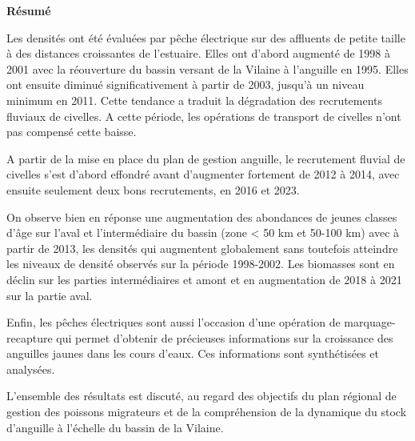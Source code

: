 \documentclass[10pt,twocolumn,titlepage,twoside]{article}\usepackage[]{graphicx}\usepackage[]{color}
\begin{document}
\onecolumn
\thispagestyle{empty}
\pagecolor{bleu_EV}
\begin{tcolorbox}[enhanced jigsaw,
                  colback=turquoise_EV!30,%
                  colframe=turquoise_EV,%
                  width=\textwidth,%
                  arc=3mm, auto outer arc,
                  boxrule=5pt,
                  drop shadow={bleu_EV!50!gray!80}
                 ]
\textbf{Résumé}\par

 \vspace{8mm}
 
 
    Les densités ont été évaluées par pêche électrique  sur des
    affluents de petite taille à des distances croissantes de l'estuaire.     
    Elles ont d'abord augmenté de 1998 à 2001 avec la réouverture du
    bassin versant de la Vilaine à l'anguille en 1995. Elles ont ensuite diminué
    significativement à partir de 2003, jusqu'à un niveau minimum en 2011. Cette tendance a traduit la dégradation des
    recrutements fluviaux de civelles. A cette période, les opérations de
    transport de civelles n'ont pas compensé cette baisse.  
    
    A partir de la mise en place du plan de gestion anguille,  le recrutement
    fluvial de civelles s'est d'abord effondré avant d'augmenter fortement de
    2012 à 2014, avec ensuite seulement deux bons recrutements, en 2016 et 2023.
    
    On observe bien en réponse une augmentation des abondances de jeunes
    classes d'âge sur l'aval et l'intermédiaire du bassin (zone < 50 km et
    50-100 km) avec à partir de 2013, les densités qui augmentent globalement
    sans toutefois atteindre les niveaux de densité
    observés sur la période 1998-2002. Les biomasses sont en déclin sur les
    parties intermédiaires et amont et en augmentation 
    de 2018 à 2021 sur la partie aval.
    
    Enfin, les pêches électriques sont aussi l'occasion d'une opération de
    marquage-recapture qui permet d'obtenir de précieuses informations sur la
    croissance des anguilles jaunes dans les cours d'eaux. Ces informations sont
    synthétisées et analysées.
    
    L'ensemble des résultats est discuté, au regard des objectifs du plan
    régional de gestion des poissons migrateurs et de la compréhension de la
    dynamique du stock d'anguille à l'échelle du bassin de la Vilaine.\\
        

\end{tcolorbox}
\end{document}
